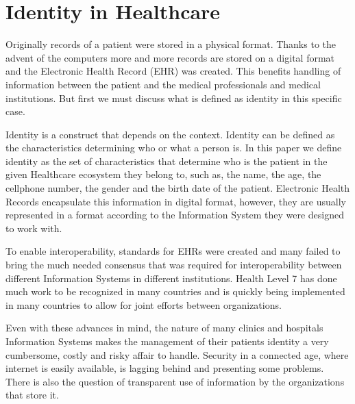 \section{Identity in Healthcare}

Originally records of a patient were stored in a physical format.  Thanks to
the advent of the computers more and more records are stored on a digital
format and the Electronic Health Record (EHR) was created.  This benefits
handling of information between the patient and the medical professionals and
medical institutions. But first we must discuss what is defined as identity in
this specific case.

Identity is a construct that depends on the context.  Identity can be defined
as the characteristics determining who or what a person is.  In this paper we
define identity as the set of characteristics that determine who is the patient
in the given Healthcare ecosystem they belong to, such as, the name, the age,
the cellphone number, the gender and the birth date of the patient.  Electronic
Health Records encapsulate this information in digital format, however, they
are usually represented in a format according to the Information System they
were designed to work with.

To enable interoperability, standards for EHRs were created and many failed to
bring the much needed consensus that was required for interoperability between
different Information Systems in different institutions.  Health Level 7 has
done much work to be recognized in many countries and is quickly being
implemented in many countries to allow for joint efforts between organizations.

Even with these advances in mind, the nature of many clinics and hospitals
Information Systems makes the management of their patients identity a very
cumbersome, costly and risky affair to handle.  Security in a connected age,
where internet is easily available, is lagging behind and presenting some
problems.  There is also the question of transparent use of information by the
organizations that store it.
